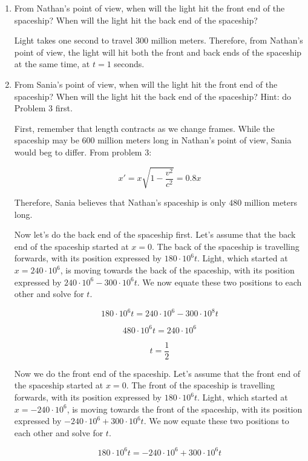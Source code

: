 \documentclass{article}
\begin{document}
\begin{enumerate}[label=(\alph*)]
    \item From Nathan's point of view, when will the light hit the front end of the spaceship? When will the light hit the back end of the spaceship?

    Light takes one second to travel $300$ million meters. Therefore, from Nathan's point of view, the light will hit both the front and back ends of the spaceship at the same time, at $\boxed{t = 1}$ seconds.
    
    \item From Sania's point of view, when will the light hit the front end of the spaceship? When will the light hit the back end of the spaceship? Hint: do Problem 3 first.

    First, remember that length contracts as we change frames. While the spaceship may be $600$ million meters long in Nathan's point of view, Sania would beg to differ. From problem 3:

    $$x' = x\sqrt{1 - \frac{v^2}{c^2}} = 0.8x$$

    Therefore, Sania believes that Nathan's spaceship is only $480$ million meters long.

    \vspace{1cm}

    Now let's do the back end of the spaceship first. Let's assume that the back end of the spaceship started at $x = 0$. The back of the spaceship is travelling forwards, with its position expressed by $180 \cdot 10^6 t$. Light, which started at $x = 240 \cdot 10^6$, is moving towards the back of the spaceship, with its position expressed by $240 \cdot 10^6 - 300 \cdot 10^6 t$. We now equate these two positions to each other and solve for $t$.

    $$180 \cdot 10^6 t = 240 \cdot 10^6 - 300 \cdot 10^8 t$$

    $$480 \cdot 10^6 t = 240 \cdot 10^6$$

    $$\boxed{t = \frac{1}{2}}$$

    Now we do the front end of the spaceship. Let's assume that the front end of the spaceship started at $x = 0$. The front of the spaceship is travelling forwards, with its position expressed by $180 \cdot 10^6 t$. Light, which started at $x = -240 \cdot 10^6$, is moving towards the front of the spaceship, with its position expressed by $-240 \cdot 10^6 + 300 \cdot 10^6 t$. We now equate these two positions to each other and solve for $t$.

    $$180 \cdot 10^6 t = -240 \cdot 10^6 + 300 \cdot 10^6 t$$


\end{enumerate}
\end{document}
